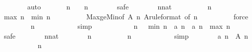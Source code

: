 \begin{isabellebody}
\ \ \ \ \ \ \isamarkupfalse%
\ auto\isanewline
\isanewline
\ \ \ \ \isamarkupfalse%
\ {\isachardoublequoteopen}{\isasymforall}\ n\ {\isasymge}\ {}{\isachardot}\ {\isacharquery}{\isasymDelta}\ n\ {\isasymge}\ {}{\isachardoublequoteclose}\isanewline
\ \ \ \ \isamarkupfalse%
\ safe\isanewline
\ \ \ \ \ \ \isamarkupfalse%
\ n{\isacharcolon}{\isacharcolon}nat\isanewline
\ \ \ \ \ \ \isamarkupfalse%
\ {\isachardoublequoteopen}{}\ {\isasymle}\ n{\isachardoublequoteclose}\isanewline
\ \ \ \ \ \ \isamarkupfalse%
\ \isamarkupfalse%
\ {\isachardoublequoteopen}{\isacharquery}max\ n\ {\isasymge}\ {\isacharquery}min\ n{\isachardoublequoteclose}\isanewline
\ \ \ \ \ \ \ \ \isamarkupfalse%
\ Max{\isacharunderscore}ge{\isacharunderscore}Min{\isacharbrackleft}of\ {\isachardoublequoteopen}{\isacharquery}A\ n{\isachardoublequoteclose}{\isacharbrackright}\ A{\isacharbrackleft}rule{\isacharunderscore}format{\isacharcomma}\ of\ n{\isacharbrackright}\isanewline
\ \ \ \ \ \ \ \ \isamarkupfalse%
\ force\isanewline
\ \ \ \ \ \ \isamarkupfalse%
\ {\isachardoublequoteopen}{\isacharquery}{\isasymDelta}\ n\ {\isasymge}\ {}{\isachardoublequoteclose}\isanewline
\ \ \ \ \ \ \ \ \isamarkupfalse%
\ simp\isanewline
\ \ \ \ \isamarkupfalse%
\isanewline
\isanewline
\ \ \ \ \isamarkupfalse%
\ {\isachardoublequoteopen}{\isasymforall}\ n\ {\isasymge}\ {}{\isachardot}\ {\isacharquery}min\ n\ {\isasymle}\ a\ n\ {\isasymand}\ a\ n\ {\isasymle}\ {\isacharquery}max\ n{\isachardoublequoteclose}\isanewline
\ \ \ \ \isamarkupfalse%
\ safe\isanewline
\ \ \ \ \ \ \isamarkupfalse%
\ n{\isacharcolon}{\isacharcolon}nat\isanewline
\ \ \ \ \ \ \isamarkupfalse%
\ {\isachardoublequoteopen}n\ {\isasymge}\ {}{\isachardoublequoteclose}\isanewline
\ \ \ \ \ \ \isamarkupfalse%
\ {\isachardoublequoteopen}n\ {\isasymge}\ {}{\isachardoublequoteclose}\isanewline
\ \ \ \ \ \ \ \ \isamarkupfalse%
\ simp\isanewline
\ \ \ \ \ \ \isamarkupfalse%
\ {\isachardoublequoteopen}a\ n\ {\isasymin}\ {\isacharquery}A\ n{\isachardoublequoteclose}\isanewline
\ \ \ \ \ \ \ \ \isamarkupfalse%
\ {\isacharasterisk}\ {\isacharbackquoteopen}n\ {\isasymge}\ {}{\isacharbackquoteclose}\isanewline
\ \ \ \ \ \ \ \ \isamarkupfalse%

\end{isabellebody}

